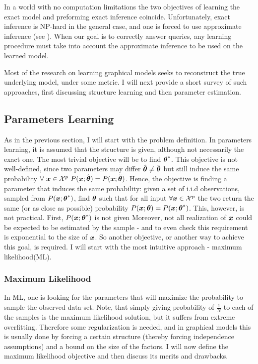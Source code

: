 In a world with no computation limitations the two objectives of learning the exact model and preforming exact inference coincide. Unfortunately, exact inference is NP-hard in the general case, and one is forced to use approximate inference (see ).
When our goal is to correctly answer queries, any learning procedure must take into account the approximate inference to be used on the learned model.

Most of the research on learning graphical models seeks to reconstruct the true underlying model, under some metric. I will next provide a short survey of such approaches, first discussing structure learning and then parameter estimation.


\subsection{Parameters Learning}
As in the previous section, I will start with the problem definition. 
In parameters learning, it is assumed that the structure is given, although not necessarily the exact one.
The most trivial objective will be to find ${\boldsymbol{\theta}}^{*}$.  
This objective is not well-defined, since two parameters may differ $\hat{\boldsymbol{\theta}} \neq \tilde{\boldsymbol{\theta}}$ but still induce the same probability $\forall\ \xx \in \cX^p\ P(\xx;\hat{\thetav}) = P(\xx;\tilde{\thetav})$.
Hence, the objective is finding a parameter that induces the same probability: given a set of i.i.d observations, sampled from $P(\boldsymbol{x};{\boldsymbol{\theta}}^{*})$, find $\boldsymbol{\theta}$ such that for all input $\forall \boldsymbol{x} \in {\cal X}^{p}$ the two return the same (or as close as possible) probability $P(\boldsymbol{x};\boldsymbol{\theta}) = P(\boldsymbol{x};{\boldsymbol{\theta}}^{*})$.
This, however, is not practical.
First, $P(\boldsymbol{x};{\boldsymbol{\theta}}^{*})$ is not given
Moreover, not all realization of $\boldsymbol{x}$ could be expected to be estimated by the sample - and to even check this requirement is exponential to the size of $\boldsymbol{x}$.
So another objective, or another way to achieve this goal, is required.
I will start with the  most intuitive approach - maximum likelihood(ML).

\subsubsection{Maximum Likelihood}
\label{sec:max_likelihood}
In ML, one is looking for the parameters that will maximize the probability to sample the observed data-set.
Note, that simply giving probability of $\frac{1}{N}$ to each of the samples is the maximum likelihood solution, but it suffers from extreme overfitting.
Therefore some regularization is needed, and in graphical models this is usually done by forcing a certain structure (thereby forcing independence assumptions) and a bound on the size of the factors.
I will now define the maximum likelihood objective and then discuss its merits and drawbacks.


